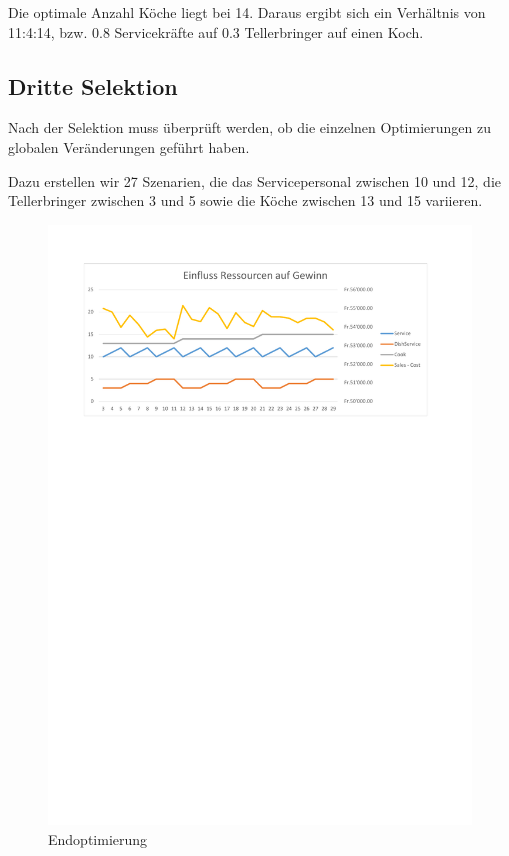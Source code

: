 \documentclass[ngerman,a4paper,12pt]{scrreprt}
\begin{document}
				Die optimale Anzahl Köche liegt bei 14. Daraus ergibt sich ein Verhältnis von 11:4:14, bzw. 0.8 Servicekräfte auf 0.3 Tellerbringer auf einen Koch.

		
		\subsection{Dritte Selektion}
			Nach der Selektion muss überprüft werden, ob die einzelnen Optimierungen zu globalen Veränderungen geführt haben.
			
			Dazu erstellen wir 27 Szenarien, die das Servicepersonal zwischen 10 und 12, die Tellerbringer zwischen 3 und 5 sowie die Köche zwischen 13 und 15 variieren.
			
				\begin{figure}[H]
					\centering
						\includegraphics[trim=2cm 22.75cm 2.5cm 2cm, clip=true,width=\textwidth]{../Auswertung/4_+-1.pdf}
						\caption[Endoptimierung]{Endoptimierung}
						\label{Endoptimierung}
				\end{figure}	
			
\end{document}
